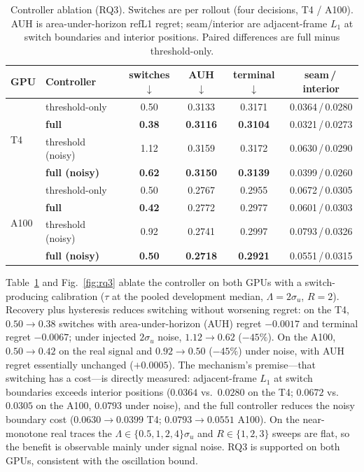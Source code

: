 \documentclass[journal]{IEEEtran}
\begin{document}
\begin{table}[!t]
\centering
\caption{Controller ablation (RQ3). Switches are per rollout (four decisions, T4 / A100). AUH is area-under-horizon refL1 regret; seam/interior are adjacent-frame $L_1$ at switch boundaries and interior positions. Paired differences are full minus threshold-only.}
\label{tab:rq3}
\renewcommand{\arraystretch}{1.12}
\footnotesize
\setlength{\tabcolsep}{3.5pt}
\begin{tabular}{@{}llcccc@{}}
\toprule
GPU & Controller & switches$\downarrow$ & AUH$\downarrow$ & terminal$\downarrow$ & seam\,/\,interior \\
\midrule
\multirow{4}{*}{T4}
 & threshold-only      & 0.50 & 0.3133 & 0.3171 & 0.0364\,/\,0.0280 \\
 & \textbf{full}       & \textbf{0.38} & \textbf{0.3116} & \textbf{0.3104} & 0.0321\,/\,0.0273 \\
 & threshold (noisy)   & 1.12 & 0.3159 & 0.3172 & 0.0630\,/\,0.0290 \\
 & \textbf{full (noisy)} & \textbf{0.62} & \textbf{0.3150} & \textbf{0.3139} & 0.0399\,/\,0.0260 \\
\midrule
\multirow{4}{*}{A100}
 & threshold-only      & 0.50 & 0.2767 & 0.2955 & 0.0672\,/\,0.0305 \\
 & \textbf{full}       & \textbf{0.42} & 0.2772 & 0.2977 & 0.0601\,/\,0.0303 \\
 & threshold (noisy)   & 0.92 & 0.2741 & 0.2997 & 0.0793\,/\,0.0326 \\
 & \textbf{full (noisy)} & \textbf{0.50} & \textbf{0.2718} & \textbf{0.2921} & 0.0551\,/\,0.0315 \\
\bottomrule
\end{tabular}
\end{table}

Table~\ref{tab:rq3} and Fig.~\ref{fig:rq3} ablate the controller on both GPUs with a switch-producing calibration ($\tau$ at the pooled development median, $\Lambda = 2\sigma_u$, $R{=}2$). Recovery plus hysteresis reduces switching without worsening regret: on the T4, $0.50 \rightarrow 0.38$ switches with area-under-horizon (AUH) regret $-0.0017$ and terminal regret $-0.0067$; under injected $2\sigma_u$ noise, $1.12 \rightarrow 0.62$ ($-45\%$). On the A100, $0.50 \rightarrow 0.42$ on the real signal and $0.92 \rightarrow 0.50$ ($-45\%$) under noise, with AUH regret essentially unchanged ($+0.0005$). The mechanism's premise---that switching has a cost---is directly measured: adjacent-frame $L_1$ at switch boundaries exceeds interior positions ($0.0364$ vs.\ $0.0280$ on the T4; $0.0672$ vs.\ $0.0305$ on the A100, $0.0793$ under noise), and the full controller reduces the noisy boundary cost ($0.0630 \rightarrow 0.0399$ T4; $0.0793 \rightarrow 0.0551$ A100). On the near-monotone real traces the $\Lambda \in \{0.5,1,2,4\}\sigma_u$ and $R \in \{1,2,3\}$ sweeps are flat, so the benefit is observable mainly under signal noise. RQ3 is supported on both GPUs, consistent with the oscillation bound.
\end{document}
